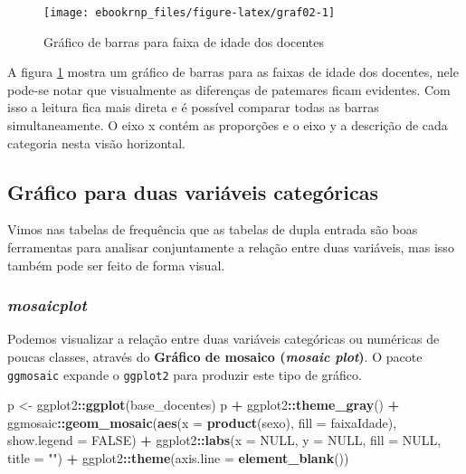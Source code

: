\documentclass[11pt,]{style/krantz}
\makeatletter
\newenvironment{Shaded}{\begin{snugshade}}{\end{snugshade}}
\newcommand{\DataTypeTok}[1]{\textcolor[rgb]{0.13,0.29,0.53}{#1}}
\newcommand{\KeywordTok}[1]{\textcolor[rgb]{0.13,0.29,0.53}{\textbf{#1}}}
\newcommand{\NormalTok}[1]{#1}
\newcommand{\OperatorTok}[1]{\textcolor[rgb]{0.81,0.36,0.00}{\textbf{#1}}}
\newcommand{\OtherTok}[1]{\textcolor[rgb]{0.56,0.35,0.01}{#1}}
\newcommand{\StringTok}[1]{\textcolor[rgb]{0.31,0.60,0.02}{#1}}
\newenvironment{kframe}{%
\medskip{}
\setlength{\fboxsep}{.8em}
 \def\at@end@of@kframe{}%
 \ifinner\ifhmode%
  \def\at@end@of@kframe{\end{minipage}}%
  \begin{minipage}{\columnwidth}%
 \fi\fi%
 \def\FrameCommand##1{\hskip\@totalleftmargin \hskip-\fboxsep
 \colorbox{shadecolor}{##1}\hskip-\fboxsep
     \hskip-\linewidth \hskip-\@totalleftmargin \hskip\columnwidth}%
 \MakeFramed {\advance\hsize-\width
   \@totalleftmargin\z@ \linewidth\hsize
   \@setminipage}}%
 {\par\unskip\endMakeFramed%
 \at@end@of@kframe}
\renewenvironment{Shaded}{\begin{kframe}}{\end{kframe}}
\theoremstyle{definition}
\theoremstyle{definition}
\theoremstyle{definition}
\theoremstyle{remark}
\makeatother
\begin{document}
\begin{figure}[H]

{\centering \texttt{[image: ebookrnp\_files/figure-latex/graf02-1]}

}

\caption{Gráfico de barras para faixa de idade dos docentes}\label{fig:graf02}
\end{figure}

A figura \ref{fig:graf02} mostra um gráfico de barras para as faixas de idade dos docentes, nele pode-se notar que visualmente as diferenças de patemares ficam evidentes. Com isso a leitura fica mais direta e é possível comparar todas as barras simultaneamente. O eixo x contém as proporções e o eixo y a descrição de cada categoria nesta visão horizontal.

\hypertarget{grafico-para-duas-variaveis-categoricas}{%
\subsection{Gráfico para duas variáveis categóricas}\label{grafico-para-duas-variaveis-categoricas}}

Vimos nas tabelas de frequência que as tabelas de dupla entrada são boas ferramentas para analisar conjuntamente a relação entre duas variáveis, mas isso também pode ser feito de forma visual.

\hypertarget{mosaicplot}{%
\subsubsection{\texorpdfstring{\emph{mosaicplot}}{mosaicplot}}\label{mosaicplot}}

Podemos visualizar a relação entre duas variáveis categóricas ou numéricas de poucas classes, através do \textbf{Gráfico de mosaico (\emph{mosaic plot})}. O pacote \texttt{ggmosaic} expande o \texttt{ggplot2} para produzir este tipo de gráfico.

\begin{Shaded}
\begin{Highlighting}[]
\NormalTok{p <-}\StringTok{ }\NormalTok{ggplot2}\OperatorTok{::}\KeywordTok{ggplot}\NormalTok{(base_docentes)}
\NormalTok{p }\OperatorTok{+}\StringTok{ }\NormalTok{ggplot2}\OperatorTok{::}\KeywordTok{theme_gray}\NormalTok{() }\OperatorTok{+}
\StringTok{  }\NormalTok{ggmosaic}\OperatorTok{::}\KeywordTok{geom_mosaic}\NormalTok{(}\KeywordTok{aes}\NormalTok{(}\DataTypeTok{x =} \KeywordTok{product}\NormalTok{(sexo), }\DataTypeTok{fill =}\NormalTok{ faixaIdade), }
                        \DataTypeTok{show.legend =} \OtherTok{FALSE}\NormalTok{) }\OperatorTok{+}
\StringTok{  }\NormalTok{ggplot2}\OperatorTok{::}\KeywordTok{labs}\NormalTok{(}\DataTypeTok{x =} \OtherTok{NULL}\NormalTok{, }\DataTypeTok{y =} \OtherTok{NULL}\NormalTok{, }\DataTypeTok{fill =} \OtherTok{NULL}\NormalTok{, }\DataTypeTok{title =} \StringTok{""}\NormalTok{) }\OperatorTok{+}
\StringTok{  }\NormalTok{ggplot2}\OperatorTok{::}\KeywordTok{theme}\NormalTok{(}\DataTypeTok{axis.line =} \KeywordTok{element_blank}\NormalTok{())}
\end{Highlighting}
\end{Shaded}
\end{document}
